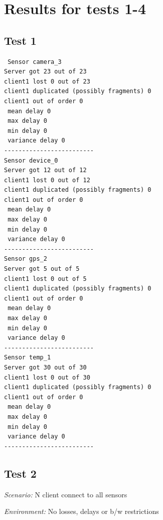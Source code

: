 \chapter{Results for tests 1-4}
\section*{Test 1}
\begin{verbatim}
 Sensor camera_3 
Server got 23 out of 23 
client1 lost 0 out of 23 
client1 duplicated (possibly fragments) 0 
client1 out of order 0 
 mean delay 0 
 max delay 0 
 min delay 0 
 variance delay 0 
-------------------------
Sensor device_0 
Server got 12 out of 12 
client1 lost 0 out of 12 
client1 duplicated (possibly fragments) 0 
client1 out of order 0 
 mean delay 0 
 max delay 0 
 min delay 0 
 variance delay 0 
-------------------------
Sensor gps_2 
Server got 5 out of 5 
client1 lost 0 out of 5 
client1 duplicated (possibly fragments) 0 
client1 out of order 0 
 mean delay 0 
 max delay 0 
 min delay 0 
 variance delay 0 
-------------------------
Sensor temp_1 
Server got 30 out of 30 
client1 lost 0 out of 30 
client1 duplicated (possibly fragments) 0 
client1 out of order 0 
 mean delay 0 
 max delay 0 
 min delay 0 
 variance delay 0 
-------------------------
\end{verbatim}



\section*{Test 2}

\hspace*{4.3mm} \textit{Scenario:} N client connect to all sensors

\textit{Environment:} No losses, delays or b/w restrictions

